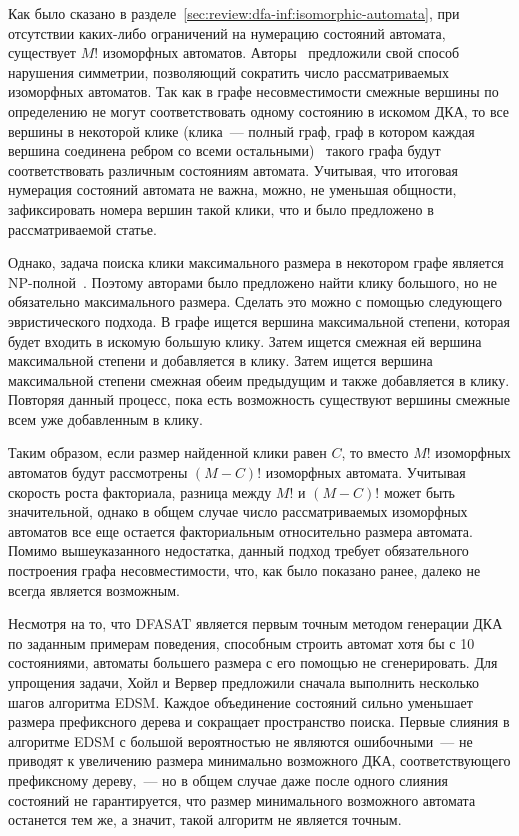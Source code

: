 Как было сказано в разделе~\ref{sec:review:dfa-inf:isomorphic-automata}, при отсутствии каких-либо ограничений на нумерацию состояний автомата, существует $M!$ изоморфных автоматов.
Авторы~\cite{heule-icgi10} предложили свой способ нарушения симметрии, позволяющий сократить число рассматриваемых изоморфных автоматов.
Так как в графе несовместимости смежные вершины по определению не могут соответствовать одному состоянию в искомом ДКА, то все вершины в некоторой клике (клика~{---} полный граф, граф в котором каждая вершина соединена ребром со всеми остальными)~\cite{Luce1949} такого графа будут соответствовать различным состояниям автомата.
Учитывая, что итоговая нумерация состояний автомата не важна, можно, не уменьшая общности, зафиксировать номера вершин такой клики, что и было предложено в рассматриваемой статье.

Однако, задача поиска клики максимального размера в некотором графе является NP-полной~\cite{DBLP:conf/coco/Karp72}.
Поэтому авторами было предложено найти клику большого, но не обязательно максимального размера.
Сделать это можно с помощью следующего эвристического подхода.
В графе ищется вершина максимальной степени, которая будет входить в искомую большую клику.
Затем ищется смежная ей вершина максимальной степени и добавляется в клику.
Затем ищется вершина максимальной степени смежная обеим предыдущим и также добавляется в клику. 
Повторяя данный процесс, пока есть возможность существуют вершины смежные всем уже добавленным в клику.

Таким образом, если размер найденной клики равен $C$, то вместо $M!$ изоморфных автоматов будут рассмотрены $(M - C)!$ изоморфных автомата.
Учитывая скорость роста факториала, разница между $M!$ и $(M - C)!$ может быть значительной, однако в общем случае число рассматриваемых изоморфных автоматов все еще остается факториальным относительно размера автомата.
Помимо вышеуказанного недостатка, данный подход требует обязательного построения графа несовместимости, что, как было показано ранее, далеко не всегда является возможным.

Несмотря на то, что DFASAT является первым точным методом генерации ДКА по заданным примерам поведения, способным строить автомат хотя бы с 10 состояниями, автоматы большего размера с его помощью не сгенерировать.
Для упрощения задачи, Хойл и Вервер предложили сначала выполнить несколько шагов алгоритма EDSM.
Каждое объединение состояний сильно уменьшает размера префиксного дерева и сокращает пространство поиска.
Первые слияния в алгоритме EDSM с большой вероятностью не являются ошибочными~--- не приводят к увеличению размера минимально возможного ДКА, соответствующего префиксному дереву,~--- но в общем случае даже после одного слияния состояний не гарантируется, что размер минимального возможного автомата останется тем же, а значит, такой алгоритм не является точным.

